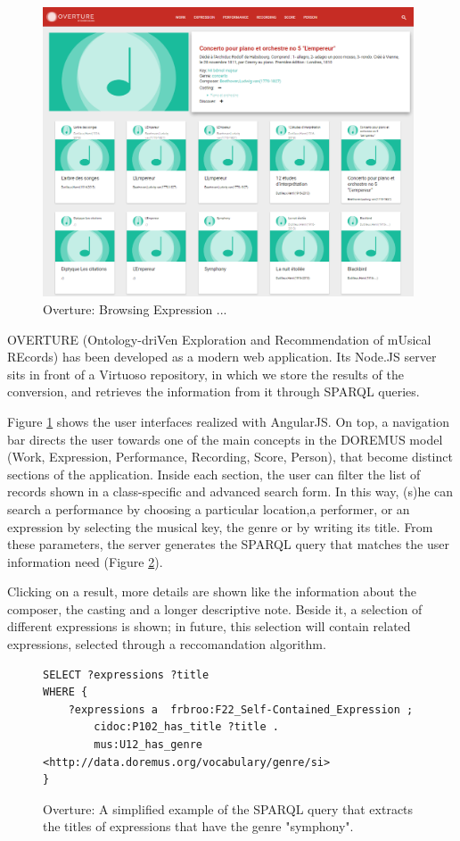 \documentclass[runningheads,a4paper]{llncs}
\begin{document}
\begin{figure}
  \centering
  \includegraphics[width=11cm]{img/overture-detail.png}
  \caption{Overture: Browsing Expression ...}
  \label{fig:overture-detail}
\end{figure}

OVERTURE (Ontology-driVen Exploration and Recommendation of mUsical REcords) has been developed as a modern web application. Its Node.JS server sits in front of a Virtuoso repository, in which we store the results of the conversion, and retrieves the information from it through SPARQL queries.

Figure \ref{fig:overture-detail} shows the user interfaces realized with AngularJS. On top, a navigation bar directs the user towards one of the main concepts in the DOREMUS model (Work, Expression, Performance, Recording, Score, Person), that become distinct sections of the application. Inside each section, the user can filter the list of records shown in a class-specific and advanced search form. In this way, (s)he can search a performance by choosing a particular location,a performer, or an expression by selecting the musical key, the genre or by writing its title. From these parameters, the server generates the SPARQL query that matches the user information need (Figure \ref{fig:sparql}). 

Clicking on a result, more details are shown like the information about the composer, the casting and a longer descriptive note. Beside it, a selection of different expressions is shown; in future, this selection will contain related expressions, selected through a reccomandation algorithm.

\begin{figure}
\centering
\begin{verbatim}
SELECT ?expressions ?title
WHERE {
    ?expressions a  frbroo:F22_Self-Contained_Expression ;
        cidoc:P102_has_title ?title .
        mus:U12_has_genre <http://data.doremus.org/vocabulary/genre/si>
}
\end{verbatim}
\caption{Overture: A simplified example of the SPARQL query that extracts the titles of expressions that have the genre "symphony".}
\label{fig:sparql}
\end{figure}
\end{document}
